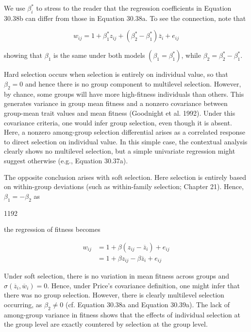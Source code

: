 \documentclass{article}
\begin{document}
We use  $ \beta_{i}^{*} $ to stress to the reader that the regression coefficients in Equation 30.38b can differ from those in Equation 30.38a. To see the connection, note that

\begin{equation}
w_{ij}=1+\beta_{1}^{*}z_{ij}+\left(\beta_{2}^{*}-\beta_{1}^{*}\right)\overline{z}_{i}+e_{ij}
\tag{30.38c}
\label{eq:30_38c}
\end{equation}

showing that  $ \beta_{1} $ is the same under both models  $ (\beta_{1}=\beta_{1}^{*}) $, while  $ \beta_{2}=\beta_{2}^{*}-\beta_{1}^{*} $.

Hard selection occurs when selection is entirely on individual value, so that  $ \beta_{2}=0 $ and hence there is no group component to multilevel selection. However, by chance, some groups will have more high-fitness individuals than others. This generates variance in group mean fitness and a nonzero covariance between group-mean trait values and mean fitness (Goodnight et al. 1992). Under this covariance criteria, one would infer group selection, even though it is absent. Here, a nonzero among-group selection differential arises as a correlated response to direct selection on individual value. In this simple case, the contextual analysis clearly shows no multilevel selection, but a simple univariate regression might suggest otherwise (e.g., Equation 30.37a).

The opposite conclusion arises with soft selection. Here selection is entirely based on within-group deviations (such as within-family selection; Chapter 21). Hence,  $ \beta_{1} = -\beta_{2} $ as

1192

the regression of fitness becomes

\begin{equation}
\begin{aligned}w_{ij}&=1+\beta\left(z_{ij}-\overline{z}_{i}\right)+e_{ij}\\&=1+\beta z_{ij}-\beta\overline{z}_{i}+e_{ij}\end{aligned}
\tag{30.39a}
\label{eq:30_39a}
\end{equation}

Under soft selection, there is no variation in mean fitness across groups and  $ \sigma(\overline{z}_i, \overline{w}_i) = 0 $. Hence, under Price's covariance definition, one might infer that there was no group selection. However, there is clearly multilevel selection occurring, as  $ \beta_2 \neq 0 $ (cf. Equation 30.38a and Equation 30.39a). The lack of among-group variance in fitness shows that the effects of individual selection at the group level are exactly countered by selection at the group level.
\end{document}
